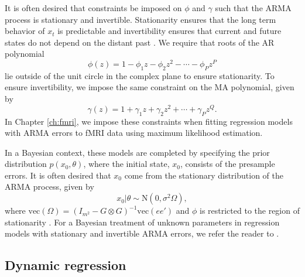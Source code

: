 It is often desired that constraints be imposed on $\phi$ and $\gamma$ such that the ARMA process is stationary and invertible. Stationarity ensures that the long term behavior of $x_t$ is predictable and invertibility ensures that current and future states do not depend on the distant past \citep{shum:stof:2006:timeseries}. We require that roots of the AR polynomial
\begin{equation}
\phi(z) = 1 - \phi_1z - \phi_2z^2 - \cdots - \phi_Pz^P \label{eqn:arpoly}
\end{equation}
lie outside of the unit circle in the complex plane to ensure stationarity. To ensure invertibility, we impose the same constraint on the MA polynomial, given by
\begin{equation}
\gamma(z) = 1 + \gamma_1z + \gamma_2z^2 + \cdots + \gamma_Pz^Q. \label{eqn:mapoly}
\end{equation}
In Chapter \ref{ch:fmri}, we impose these constraints when fitting regression models with ARMA errors to fMRI data using maximum likelihood estimation.

In a Bayesian context, these models are completed by specifying the prior distribution $p(x_0, \theta)$, where the initial state, $x_0$, consists of the presample errors. It is often desired that $x_0$ come from the stationary distribution of the ARMA process, given by
\begin{equation}
x_0|\theta \sim \mbox{N}(0, \sigma^2\Omega), \label{eqn:arma:prior}
\end{equation}
where $\mbox{vec}(\Omega) = (I_{m^2} - G\otimes G)^{-1} \mbox{vec}(ee')$ and $\phi$ is restricted to the region of stationarity \citep{chib:greenberg:1994:arma}. For a Bayesian treatment of unknown parameters in regression models with stationary and invertible ARMA errors, we refer the reader to \citet{chib:greenberg:1994:arma}.

\subsection{Dynamic regression \label{sec:dlm:arwn}}

